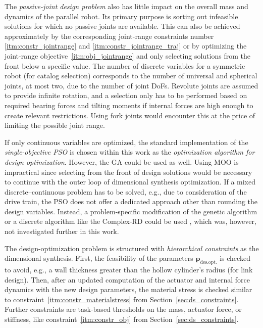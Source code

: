 The \emph{passive-joint design problem} also has little impact on the overall mass and dynamics of the parallel robot.
Its primary purpose is sorting out infeasible solutions for which no passive joints are available. 
This can also be achieved approximately by the corresponding joint-range constraints number \ref{itm:constr_jointrange} and \ref{itm:constr_jointrange_traj} or by optimizing the joint-range objective~\ref{itm:obj_jointrange} and only selecting solutions from the  front below a specific value.
%
The number of discrete variables for a symmetric robot (for catalog selection) corresponds to the number of universal and spherical joints, at most two, due to the number of joint DoFs.
Revolute joints are assumed to provide infinite rotation, and a selection only has to be performed based on required bearing forces and tilting moments if internal forces are high enough to create relevant restrictions.
Using fork joints would encounter this at the price of limiting the possible joint range.

If only continuous variables are optimized, the standard implementation of the \emph{single-objective PSO} is chosen within this work as the \emph{optimization algorithm for design optimization}.
However, the GA could be used as well.
Using MOO is impractical since selecting from the  front of design solutions would be necessary to continue with the outer loop of dimensional synthesis optimization.
{If} a mixed discrete--continuous problem has to be solved, e.g., due to consideration of the drive train, the PSO does not offer a dedicated approach other than rounding the design variables. %
Instead, a problem-specific modification of the genetic algorithm or a discrete algorithm like the Complex-RD could be used \cite{PetterssonAndKru2005}, which was, however, not investigated further in this work.

The design-optimization problem is structured with \emph{hierarchical constraints} as the dimensional synthesis.
First, the feasibility of the parameters {$\bm{p}_{\mathrm{des.opt.}}$} is checked to avoid, e.g., a wall thickness greater than the hollow cylinder's radius (for link design).
Then, after an updated computation of the actuator and internal force dynamics with the new design parameters, the material stress is checked similar to constraint~\ref{itm:constr_materialstress} from Section~\ref{sec:ds_constraints}.
Further constraints are task-based thresholds on the mass, actuator force, or stiffness, like constraint~\ref{itm:constr_obj} from Section~\ref{sec:ds_constraints}.

